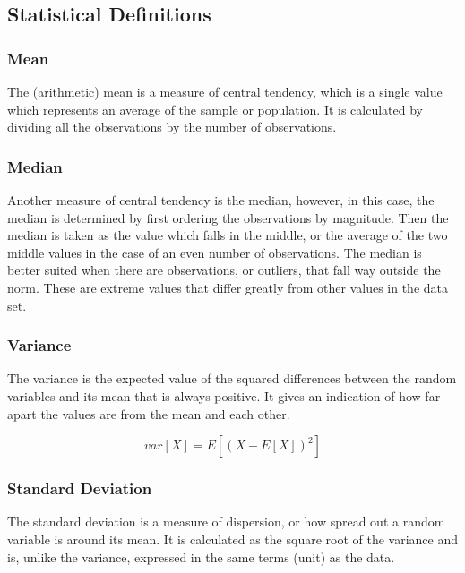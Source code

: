 \documentclass[12pt,]{article}
\begin{document}
\subsection{Statistical Definitions}\label{statistical-definitions}

\subsubsection{Mean}\label{mean}

The (arithmetic) mean is a measure of central tendency, which is a
single value which represents an average of the sample or population. It
is calculated by dividing all the observations by the number of
observations.

\subsubsection{Median}\label{median}

Another measure of central tendency is the median, however, in this
case, the median is determined by first ordering the observations by
magnitude. Then the median is taken as the value which falls in the
middle, or the average of the two middle values in the case of an even
number of observations. The median is better suited when there are
observations, or outliers, that fall way outside the norm. These are
extreme values that differ greatly from other values in the data set.

\subsubsection{Variance}\label{variance}

The variance is the expected value of the squared differences between
the random variables and its mean that is always positive. It gives an
indication of how far apart the values are from the mean and each other.

\[ var[X] = E[(X - E[X])^2] \]

\subsubsection{Standard Deviation}\label{standard-deviation}

The standard deviation is a measure of dispersion, or how spread out a
random variable is around its mean. It is calculated as the square root
of the variance and is, unlike the variance, expressed in the same terms
(unit) as the data.
\end{document}
